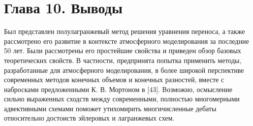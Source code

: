 \chapter*{Глава 10. Выводы} \label{chapt_10}
Был представлен полулагранжевый метод решения уравнения переноса, а также рассмотрено его развитие в контексте атмосферного моделирования за последние 50 лет. Были рассмотрены его простейшие свойства и приведен обзор базовых теоретических свойств. В частности, предпринята попытка применить методы, разработанные для атмосферного моделирования, в более широкой перспективе современных методов конечных объемов и конечных разностей, вместе с набросками предложенными К. В. Мортоном в [43]. Возможно, осмысление сильно выраженных сходств между современными, полностью многомерными адвективными схемами поможет утихомирить многичисленные дебаты относительно достоиств эйлеровых и лагранжевых схем.
